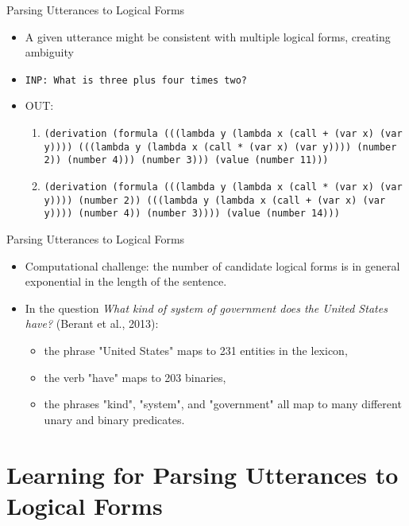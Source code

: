 \documentclass{beamer}
\begin{document}
\begin{frame}{Parsing Utterances to Logical Forms}
    \begin{itemize}
        \item A given utterance might be consistent with multiple logical forms, creating ambiguity
        \item \texttt{INP: What is three plus four times two?}
        \item OUT:
        \begin{enumerate}
            \item \texttt{(derivation (formula (((lambda y (lambda x (call + (var
x) (var y)))) (((lambda y (lambda x (call * (var x) (var
y)))) (number 2)) (number 4))) (number 3))) (value
(number 11)))}
            \item \texttt{(derivation (formula (((lambda y (lambda x (call * (var
x) (var y)))) (number 2)) (((lambda y (lambda x (call +
(var x) (var y)))) (number 4)) (number 3)))) (value
(number 14)))}
        \end{enumerate}
    \end{itemize}
\end{frame}

\begin{frame}{Parsing Utterances to Logical Forms}
    \begin{itemize}
        \item Computational challenge: the number of candidate logical forms is
in general exponential in the length of the sentence.
        \item In the question \textit{What kind of system of government does the United States have?} (Berant et al., 2013):
        \begin{itemize}
            \item the phrase "United States" maps to 231 entities in the lexicon,
            \item the verb "have" maps to 203 binaries,
            \item the phrases "kind", "system", and "government" all map to many
different unary and binary predicates.
        \end{itemize}
    \end{itemize}
\end{frame}

\section{Learning for Parsing Utterances to Logical Forms}
\end{document}
